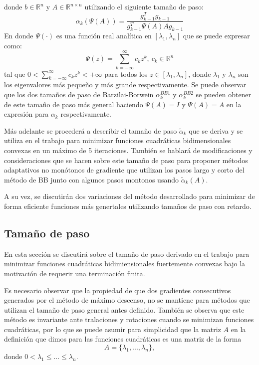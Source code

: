 donde $b\in\mathbb{R}^n$ y $A\in \mathbb{R}^{n\times n}$ utilizando el siguiente tamaño de paso:
$$
	\alpha_k(\Psi(A)) = \frac{g_{k-1}^Tg_{k-1}}{g^T_{k-1}\Psi(A)Ag_{k-1}}
$$
En donde $\Psi(\cdot)$ es una función real analítica en $[\lambda_1, \lambda_n]$ que se puede expresar como:
$$
	\Psi(z) = \sum\limits_{k=-\infty}^{\infty} c_kz^k,\ c_k\in \mathbb{R}^n
$$
tal que $0<\sum_{k =- \infty}^{\infty}c_k z^k<+\infty$ para todos los $z\in[\lambda_1, \lambda_n]$, donde $\lambda_1$ y $\lambda_n$ son los eigenvalores más pequeño y más grande respectivamente. Se puede observar que los dos tamaños de paso de Barzilai-Borwein $\alpha_k^{BB1}$ y $\alpha_k^{BB2}$ se pueden obtener de este tamaño de paso más general haciendo $\Psi(A) = I$ y $\Psi(A) = A$ en la expresión para $\alpha_k$ respectivamente.
\par Más adelante se procederá a describir el tamaño de paso $\tilde{\alpha}_k$ que se deriva y se utiliza en el trabajo para minimizar funciones cuadráticas bidimensionales convexas en un máximo de 5 iteraciones. También se hablará de modificaciones y consideraciones que se hacen sobre este tamaño de paso para proponer métodos adaptativos no monótonos de gradiente que utilizan los pasos largo y corto del método de BB junto con algunos pasos montonos usando $\tilde{\alpha}_k(A)$.
\par A su vez, se discutirán dos variaciones del método desarrollado para minimizar de forma eficiente funciones más genertales utilizando tamaños de paso con retardo.

\subsection*{Tamaño de paso}
En esta sección se discutirá sobre el tamaño de paso derivado en el trabajo para minimizar funciones cuadráticas bidimiensionales fuertemente convexas bajo la motivación de requerir una terminación finita.
\par Es necesario observar que la propiedad de que dos gradientes consecutivos generados por el método de máximo descenso, no se mantiene para métodos que utilizan el tamaño de paso general antes definido. También se observa que este método es invariante ante tralaciones y rotaciones cuando se minimizan funciones cuadráticas, por lo que se puede asumir para simplicidad que la matriz $A$ en la definición que dimos para las funciones cuadráticas es una matriz de la forma 
$$
	A = \{\lambda_1, ..., \lambda_n\},
$$
donde $0<\lambda_1\leq...\leq\lambda_n$.

